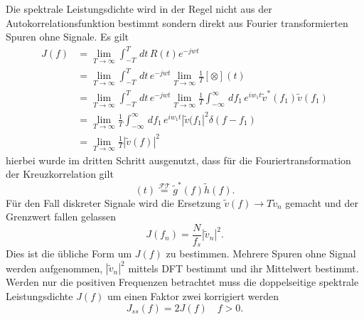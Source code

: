 Die spektrale Leistungsdichte wird in der Regel nicht aus der Autokorrelationsfunktion bestimmt sondern direkt aus Fourier transformierten Spuren ohne Signale.
Es gilt
\begin{align*}
J(f) &= \lim_{T\rightarrow \infty}\int_{-T}^{T}\,dt\, R(t) e^{-jwt} \\
&= \lim_{T\rightarrow \infty}\int_{-T}^{T}\,dt\,e^{-jwt}\lim_{T\rightarrow \infty}\frac{1}{T}[\otimes](t) \\
&= \lim_{T\rightarrow \infty}\int_{-T}^{T}\,dt\,e^{-jwt}\lim_{T\rightarrow \infty}\frac{1}{T} \int_{-\infty}^\infty\,df_1\,e^{iw_1t}\widetilde{v}^*(f_1)\widetilde{v}(f_1)\\
&= \lim_{T\rightarrow \infty}\frac{1}{T}\int_{-\infty}^\infty\,df_1\,e^{iw_1t}|\widetilde{v}(f_1|^2\delta(f-f_1) \\
&= \lim_{T\rightarrow \infty}\frac{1}{T} |\widetilde{v}(f)|^2 
\end{align*}
hierbei wurde im dritten Schritt ausgenutzt, dass für die Fouriertransformation der Kreuzkorrelation gilt
\begin{equation}
[g\otimes h](t) \stackrel{\mathcal{FT}}{=} \widetilde{g}^*(f)\widetilde{h}(f).
\end{equation}
Für den Fall diskreter Signale wird die Ersetzung $\widetilde{v}(f)\rightarrow T\widetilde{v}_n$ gemacht und der Grenzwert fallen gelassen
\begin{equation}
J(f_n) = \frac{N}{f_s}|\widetilde{v}_n|^2.
\end{equation}
Dies ist die übliche Form um $J(f)$ zu bestimmen.
Mehrere Spuren ohne Signal werden aufgenommen, $|\widetilde{v}_n|^2$ mittels DFT bestimmt und ihr Mittelwert bestimmt.
Werden nur die positiven Frequenzen betrachtet muss die doppelseitige spektrale Leistungsdichte $J(f)$ um einen Faktor zwei korrigiert werden
\begin{equation}
J_{ss}(f) = 2J(f) \quad f > 0.
\end{equation}

